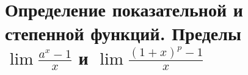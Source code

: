 \section{Определение показательной и степенной функций. Пределы $\lim{\frac{a^x - 1}{x}}$ и $\lim{\frac{(1+x)^p - 1}{x}}$}